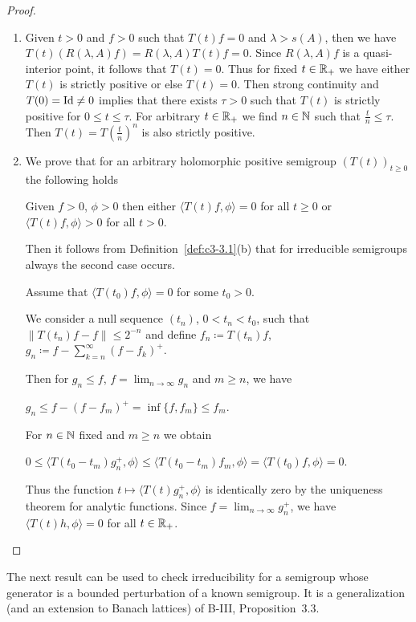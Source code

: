 \begin{proof}
\begin{enumerate}[\upshape (i), wide, labelindent=.5em]
	\item
	Given $t > 0$ and $f > 0$ such that $T(t)f = 0$ and $\lambda > s(A)$, then we have $T(t)(R(\lambda,A)f) = R(\lambda,A)T(t)f = 0$.
	Since $R(\lambda,A)f$ is a quasi-interior point, it follows that $T(t) = 0$.
	Thus for fixed $t \in \mathbb{R} _{+}$ we have either $T(t)$ is strictly positive or else $T(t) = 0$.
	Then strong continuity and $T(0) = \operatorname{Id} \neq 0$ implies that there exists $\tau > 0$ such that $T(t)$ is strictly positive for $0 \leq t \leq \tau$.
	For arbitrary $t \in \mathbb{R} _{+}$ we find $n \in \mathbb{N}$ such that $\frac{t}{n} \leq \tau$.
	Then $T(t) = T(\frac{t}{n})^{n}$ is also strictly positive.
	
	\item
	We prove that for an arbitrary holomorphic positive semigroup $(T(t))_{t\geq 0}$ the following holds
	
	Given $f > 0$, $\phi > 0$ then either $\langle T(t)f,\phi \rangle = 0$ for all $t \geq 0$ or $\langle T(t)f,\phi \rangle > 0$ for all $t > 0$.
	
	Then it follows from Definition~\ref{def:c3-3.1}(b) that for irreducible semigroups always the second case occurs.
	
	Assume that $\langle T(t_{0})f,\phi \rangle = 0$ for some $t_{0} > 0$.
	
	We consider a null sequence $(t_{n})$, $0 < t_{n} < t_{0}$, such that $\|T(t_{n})f - f\| \leq 2^{-n}$ and define $f_{n} \coloneqq T(t_{n})f$, $g_{n} \coloneqq f - \sum_{k=n}^{\infty}(f-f_{k})^{+}$.
	
	Then for $g_{n} \leq f$, $f = \lim_{n\to\infty}g_{n}$ and $m \geq n$, 
	we have 
	
	$g_{n} \leq f - (f-f_{m})^{+} = \inf\{f,f_{m}\} \leq f_{m}$.
	
	For $n \in \mathbb{N}$ fixed and $m \geq n$ we obtain 
	
	$0 \leq \langle T(t_{0}-t_{m})g_{n}^{+},\phi \rangle \leq \langle T(t_{0}-t_{m})f_{m},\phi \rangle = \langle T(t_{0})f,\phi \rangle = 0$.
	
	Thus the function $t \mapsto \langle T(t)g_{n}^{+},\phi \rangle$ is identically zero by the uniqueness theorem for analytic functions.
	Since $f = \lim_{n\to\infty}g_{n}^{+}$, we have $\langle T(t)h,\phi \rangle = 0$ for all $t \in \mathbb{R} _{+}$.
\end{enumerate}
\end{proof}
The next result can be used to check irreducibility for a semigroup whose generator is a bounded perturbation of a known semigroup. It is a generalization (and an extension to Banach lattices) of B-III, Proposition~3.3. 

